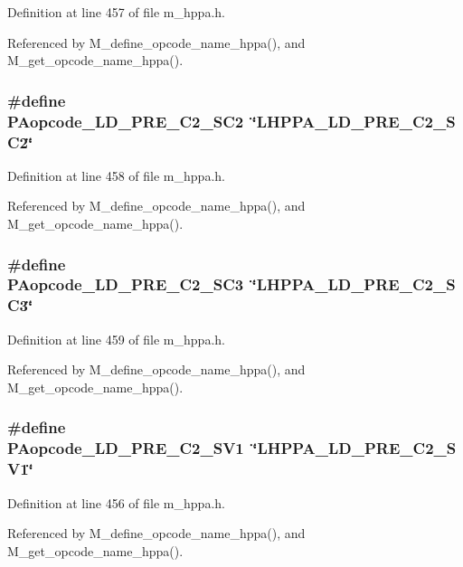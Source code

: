 Definition at line 457 of file m\_\-hppa.h.

Referenced by M\_\-define\_\-opcode\_\-name\_\-hppa(), and M\_\-get\_\-opcode\_\-name\_\-hppa().
\subsubsection{\setlength{\rightskip}{0pt plus 5cm}\#define PAopcode\_\-LD\_\-PRE\_\-C2\_\-SC2~\char`\"{}LHPPA\_\-LD\_\-PRE\_\-C2\_\-SC2\char`\"{}}\label{m__hppa_8h_80ec8fce5e49fbc73ad75b143c93dffa}




Definition at line 458 of file m\_\-hppa.h.

Referenced by M\_\-define\_\-opcode\_\-name\_\-hppa(), and M\_\-get\_\-opcode\_\-name\_\-hppa().
\subsubsection{\setlength{\rightskip}{0pt plus 5cm}\#define PAopcode\_\-LD\_\-PRE\_\-C2\_\-SC3~\char`\"{}LHPPA\_\-LD\_\-PRE\_\-C2\_\-SC3\char`\"{}}\label{m__hppa_8h_8f359db73bb0e1ca68a7b09437e2f398}




Definition at line 459 of file m\_\-hppa.h.

Referenced by M\_\-define\_\-opcode\_\-name\_\-hppa(), and M\_\-get\_\-opcode\_\-name\_\-hppa().
\subsubsection{\setlength{\rightskip}{0pt plus 5cm}\#define PAopcode\_\-LD\_\-PRE\_\-C2\_\-SV1~\char`\"{}LHPPA\_\-LD\_\-PRE\_\-C2\_\-SV1\char`\"{}}\label{m__hppa_8h_34ec049e488902b21507df0518cb7fe7}




Definition at line 456 of file m\_\-hppa.h.

Referenced by M\_\-define\_\-opcode\_\-name\_\-hppa(), and M\_\-get\_\-opcode\_\-name\_\-hppa().
